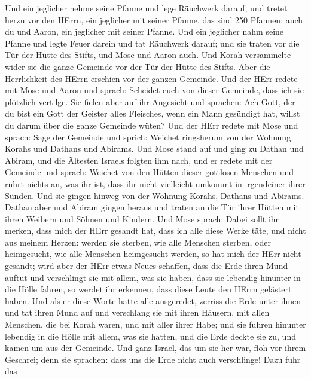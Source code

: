 Und ein jeglicher nehme seine Pfanne und lege Räuchwerk darauf, und
tretet herzu vor den HErrn, ein jeglicher mit seiner Pfanne, das sind
250 Pfannen; auch du und Aaron, ein jeglicher mit seiner Pfanne.
 Und ein jeglicher nahm seine Pfanne und legte Feuer darein
und tat Räuchwerk darauf; und sie traten vor die Tür der Hütte des
Stifts, und Mose und Aaron auch.  Und Korah versammelte
wider sie die ganze Gemeinde vor der Tür der Hütte des Stifts. Aber die
Herrlichkeit des HErrn erschien vor der ganzen Gemeinde. 
Und der HErr redete mit Mose und Aaron und sprach: 
Scheidet euch von dieser Gemeinde, dass ich sie plötzlich vertilge.
 Sie fielen aber auf ihr Angesicht und sprachen: Ach Gott,
der du bist ein Gott der Geister alles Fleisches, wenn ein Mann
gesündigt hat, willst du darum über die ganze Gemeinde wüten?
 Und der HErr redete mit Mose und sprach: 
Sage der Gemeinde und sprich: Weichet ringsherum von der Wohnung Korahs
und Dathans und Abirams.  Und Mose stand auf und ging zu
Dathan und Abiram, und die Ältesten Israels folgten ihm nach,
 und er redete mit der Gemeinde und sprach: Weichet von den
Hütten dieser gottlosen Menschen und rührt nichts an, was ihr ist, dass
ihr nicht vielleicht umkommt in irgendeiner ihrer Sünden. 
Und sie gingen hinweg von der Wohnung Korahs, Dathans und Abirams.
Dathan aber und Abiram gingen heraus und traten an die Tür ihrer Hütten
mit ihren Weibern und Söhnen und Kindern.  Und Mose sprach:
Dabei sollt ihr merken, dass mich der HErr gesandt hat, dass ich alle
diese Werke täte, und nicht aus meinem Herzen:  werden sie
sterben, wie alle Menschen sterben, oder heimgesucht, wie alle Menschen
heimgesucht werden, so hat mich der HErr nicht gesandt; 
wird aber der HErr etwas Neues schaffen, dass die Erde ihren Mund auftut
und verschlingt sie mit allem, was sie haben, dass sie lebendig hinunter
in die Hölle fahren, so werdet ihr erkennen, dass diese Leute den HErrn
gelästert haben.  Und als er diese Worte hatte alle
ausgeredet, zerriss die Erde unter ihnen  und tat ihren
Mund auf und verschlang sie mit ihren Häusern, mit allen Menschen, die
bei Korah waren, und mit aller ihrer Habe;  und sie fuhren
hinunter lebendig in die Hölle mit allem, was sie hatten, und die Erde
deckte sie zu, und kamen um aus der Gemeinde.  Und ganz
Israel, das um sie her war, floh vor ihrem Geschrei; denn sie sprachen:
dass uns die Erde nicht auch verschlinge!  Dazu fuhr das
